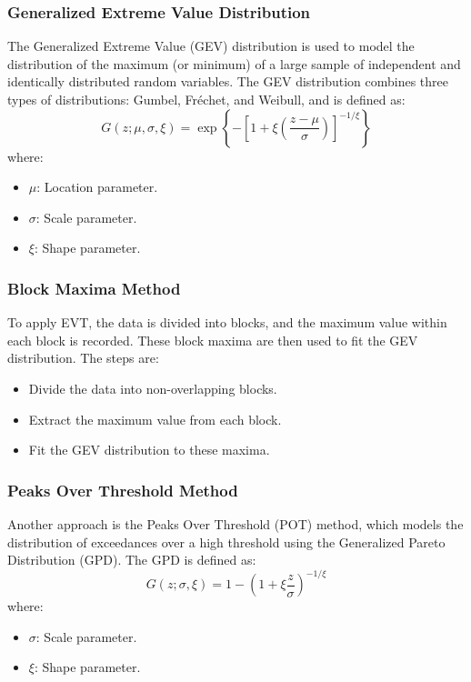 \documentclass{article}
\begin{document}
\subsubsection{Generalized Extreme Value Distribution}
The Generalized Extreme Value (GEV) distribution is used to model the distribution of the maximum (or minimum) of a large sample of independent and identically distributed random variables. The GEV distribution combines three types of distributions: Gumbel, Fréchet, and Weibull, and is defined as:
\[
G(z; \mu, \sigma, \xi) = \exp \left\{ - \left[ 1 + \xi \left( \frac{z - \mu}{\sigma} \right) \right]^{-1/\xi} \right\}
\]
where:
\begin{itemize}
    \item \( \mu \): Location parameter.
    \item \( \sigma \): Scale parameter.
    \item \( \xi \): Shape parameter.
\end{itemize}

\subsubsection{Block Maxima Method}
To apply EVT, the data is divided into blocks, and the maximum value within each block is recorded. These block maxima are then used to fit the GEV distribution. The steps are:
\begin{itemize}
    \item Divide the data into non-overlapping blocks.
    \item Extract the maximum value from each block.
    \item Fit the GEV distribution to these maxima.
\end{itemize}

\subsubsection{Peaks Over Threshold Method}
Another approach is the Peaks Over Threshold (POT) method, which models the distribution of exceedances over a high threshold using the Generalized Pareto Distribution (GPD). The GPD is defined as:
\[
G(z; \sigma, \xi) = 1 - \left( 1 + \xi \frac{z}{\sigma} \right)^{-1/\xi}
\]
where:
\begin{itemize}
    \item \( \sigma \): Scale parameter.
    \item \( \xi \): Shape parameter.
\end{itemize}
\end{document}
